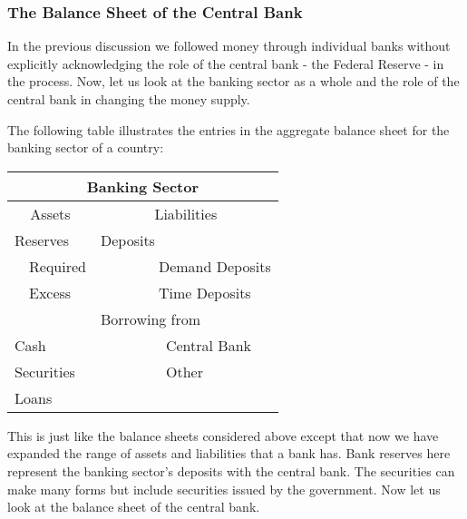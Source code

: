 \documentclass[letterpaper,12pt]{article}
\begin{document}
\subsubsection*{The Balance Sheet of the Central Bank}

In the previous discussion we followed money through individual
banks without explicitly acknowledging the role of the central bank
- the Federal Reserve - in the process. Now, let us look at the
banking sector as a whole and the role of the central bank in
changing the money supply.

The following table illustrates the entries in the aggregate balance
sheet for the banking sector of a country:

\begin{center}
\begin{tabular}{|cl|}
\hline%
\multicolumn{2}{|c|}{\textbf{Banking Sector}} \\%
\hline\hline%
\multicolumn{1}{|c|}{Assets} & \multicolumn{1}{|c|}{Liabilities} \\%
\hline\hline%
\multicolumn{1}{|l}{Reserves} & \multicolumn{1}{|l|}{Deposits} \\%
%
\multicolumn{1}{|l}{\thinspace\thinspace\thinspace\thinspace\thinspace \ \ \thinspace Required} & \multicolumn{1}{|l|}{\ \ \ \ \ \ \ \ Demand Deposits}\\%
%
\multicolumn{1}{|l}{\thinspace\thinspace\thinspace\thinspace\thinspace \thinspace\ \ Excess} & \multicolumn{1}{|l|}{\ \ \ \ \ \ \ \ Time Deposits}\\%
%
\multicolumn{1}{|l}{} & \multicolumn{1}{|l|}{Borrowing from} \\%
%
\multicolumn{1}{|l}{Cash} & \multicolumn{1}{|l|}{\ \ \ \ \ \ \ \ \ Central Bank} \\%
%
\multicolumn{1}{|l}{Securities} & \multicolumn{1}{|l|}{\ \ \ \ \ \ \ \ \ Other}\\%
%
\multicolumn{1}{|l}{Loans} & \multicolumn{1}{|l|}{} \\%
%
\hline
\end{tabular}
\end{center}

This is just like the balance sheets considered above except that
now we have expanded the range of assets and liabilities that a bank
has. Bank reserves here represent the banking sector's deposits with
the central bank. The securities can make many forms but include
securities issued by the government. Now let us look at the balance
sheet of the central bank.
\end{document}
